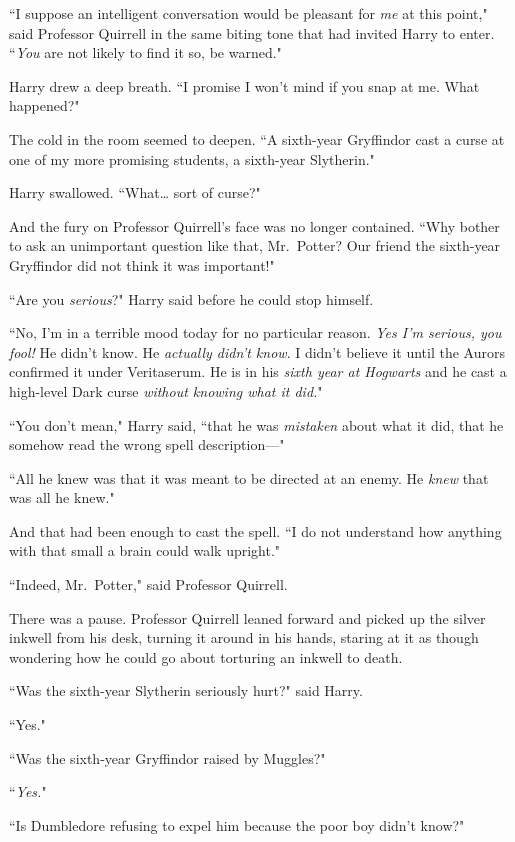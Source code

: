 ``I suppose an intelligent conversation would be pleasant for \emph{me} at this point," said Professor Quirrell in the same biting tone that had invited Harry to enter. ``\emph{You} are not likely to find it so, be warned."

Harry drew a deep breath. ``I promise I won't mind if you snap at me. What happened?"

The cold in the room seemed to deepen. ``A sixth-year Gryffindor cast a curse at one of my more promising students, a sixth-year Slytherin."

Harry swallowed. ``What{\ldots} sort of curse?"

And the fury on Professor Quirrell's face was no longer contained. ``Why bother to ask an unimportant question like that, Mr.~Potter? Our friend the sixth-year Gryffindor did not think it was important!"

``Are you \emph{serious}?" Harry said before he could stop himself.

``No, I'm in a terrible mood today for no particular reason. \emph{Yes I'm serious, you fool!} He didn't know. He \emph{actually didn't know}. I didn't believe it until the Aurors confirmed it under Veritaserum. He is in his \emph{sixth year at Hogwarts} and he cast a high-level Dark curse \emph{without knowing what it did.}"

``You don't mean," Harry said, ``that he was \emph{mistaken} about what it did, that he somehow read the wrong spell description—"

``All he knew was that it was meant to be directed at an enemy. He \emph{knew} that was all he knew."

And that had been enough to cast the spell. ``I do not understand how anything with that small a brain could walk upright."

``Indeed, Mr.~Potter," said Professor Quirrell.

There was a pause. Professor Quirrell leaned forward and picked up the silver inkwell from his desk, turning it around in his hands, staring at it as though wondering how he could go about torturing an inkwell to death.

``Was the sixth-year Slytherin seriously hurt?" said Harry.

``Yes."

``Was the sixth-year Gryffindor raised by Muggles?"

``\emph{Yes.}"

``Is Dumbledore refusing to expel him because the poor boy didn't know?"

